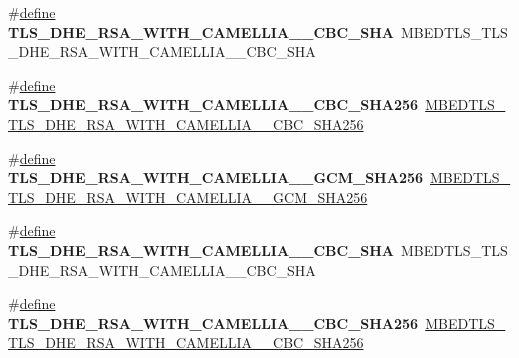 \begin{DoxyCompactItemize}
\#\hyperlink{structdefine}{define} {\bfseries T\+L\+S\+\_\+\+D\+H\+E\+\_\+\+R\+S\+A\+\_\+\+W\+I\+T\+H\+\_\+\+C\+A\+M\+E\+L\+L\+I\+A\+\_\+\_\+\+C\+B\+C\+\_\+\+S\+HA}~M\+B\+E\+D\+T\+L\+S\+\_\+\+T\+L\+S\+\_\+\+D\+H\+E\+\_\+\+R\+S\+A\+\_\+\+W\+I\+T\+H\+\_\+\+C\+A\+M\+E\+L\+L\+I\+A\+\_\+\_\+\+C\+B\+C\+\_\+\+S\+HA
\item 
\mbox{\label{compat-1_83_8h_a54e0e07b7560eded37f6fddf43bce334}} 
\#\hyperlink{structdefine}{define} {\bfseries T\+L\+S\+\_\+\+D\+H\+E\+\_\+\+R\+S\+A\+\_\+\+W\+I\+T\+H\+\_\+\+C\+A\+M\+E\+L\+L\+I\+A\+\_\+\_\+\+C\+B\+C\+\_\+\+S\+H\+A256}~\hyperlink{ssl__ciphersuites_8h_a75058a24900ecaa3411bf19379b32914}{M\+B\+E\+D\+T\+L\+S\+\_\+\+T\+L\+S\+\_\+\+D\+H\+E\+\_\+\+R\+S\+A\+\_\+\+W\+I\+T\+H\+\_\+\+C\+A\+M\+E\+L\+L\+I\+A\+\_\+\_\+\+C\+B\+C\+\_\+\+S\+H\+A256}
\item 
\mbox{\label{compat-1_83_8h_ace165cdb18f9640a9d7dcd9585d962e2}} 
\#\hyperlink{structdefine}{define} {\bfseries T\+L\+S\+\_\+\+D\+H\+E\+\_\+\+R\+S\+A\+\_\+\+W\+I\+T\+H\+\_\+\+C\+A\+M\+E\+L\+L\+I\+A\+\_\+\_\+\+G\+C\+M\+\_\+\+S\+H\+A256}~\hyperlink{ssl__ciphersuites_8h_a521dfdf48c7a3abf9f9cd5d043df2de1}{M\+B\+E\+D\+T\+L\+S\+\_\+\+T\+L\+S\+\_\+\+D\+H\+E\+\_\+\+R\+S\+A\+\_\+\+W\+I\+T\+H\+\_\+\+C\+A\+M\+E\+L\+L\+I\+A\+\_\+\_\+\+G\+C\+M\+\_\+\+S\+H\+A256}
\item 
\mbox{\label{compat-1_83_8h_a62aa85a37da68dc2578ce8a3e0b9043b}} 
\#\hyperlink{structdefine}{define} {\bfseries T\+L\+S\+\_\+\+D\+H\+E\+\_\+\+R\+S\+A\+\_\+\+W\+I\+T\+H\+\_\+\+C\+A\+M\+E\+L\+L\+I\+A\+\_\+\_\+\+C\+B\+C\+\_\+\+S\+HA}~M\+B\+E\+D\+T\+L\+S\+\_\+\+T\+L\+S\+\_\+\+D\+H\+E\+\_\+\+R\+S\+A\+\_\+\+W\+I\+T\+H\+\_\+\+C\+A\+M\+E\+L\+L\+I\+A\+\_\+\_\+\+C\+B\+C\+\_\+\+S\+HA
\item 
\mbox{\label{compat-1_83_8h_aac266cf5d51ae6f91c41a8de48ea3067}} 
\#\hyperlink{structdefine}{define} {\bfseries T\+L\+S\+\_\+\+D\+H\+E\+\_\+\+R\+S\+A\+\_\+\+W\+I\+T\+H\+\_\+\+C\+A\+M\+E\+L\+L\+I\+A\+\_\+\_\+\+C\+B\+C\+\_\+\+S\+H\+A256}~\hyperlink{ssl__ciphersuites_8h_a0384999299d42ddad6da4d48b5fd2560}{M\+B\+E\+D\+T\+L\+S\+\_\+\+T\+L\+S\+\_\+\+D\+H\+E\+\_\+\+R\+S\+A\+\_\+\+W\+I\+T\+H\+\_\+\+C\+A\+M\+E\+L\+L\+I\+A\+\_\+\_\+\+C\+B\+C\+\_\+\+S\+H\+A256}
\item 
\mbox{\label{compat-1_83_8h_a793747467af310fc48d92c1e6cb2ac03}} 

\end{DoxyCompactItemize}
